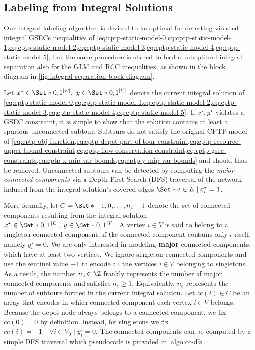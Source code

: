 \subsection{Labeling from Integral Solutions}
\label{sec:impl-labeling-integral-solutions}

Our integral labeling algorithm
is devised to be optimal for detecting violated integral GSECs inequalities
of \cref{eq:cptp-static-model-0,eq:cptp-static-model-1,eq:cptp-static-model-2,eq:cptp-static-model-3,eq:cptp-static-model-4,eq:cptp-static-model-5},
but the same procedure is shared
to feed a suboptimal integral separation also for the GLM and RCC inequalities,
as shown in the block diagram in \cref{fig:integral-separation-block-diagram}.

Let $x^\star \in \Set*{0, 1}^{|E|},\ y \in \Set*{0, 1}^{|V|}$ denote the
current integral solution of
\cref{eq:cptp-static-model-0,eq:cptp-static-model-1,eq:cptp-static-model-2,eq:cptp-static-model-3,eq:cptp-static-model-4,eq:cptp-static-model-5}.
If $x^\star, y^\star$ violates a GSEC constraint,
it is simple to show that the solution contains at least a spurious unconnected subtour.
Subtours do not satisfy the original CPTP model of
\cref{eq:cptp-obj-function,eq:cptp-depot-part-of-tour-constraint,eq:cptp-resource-upper-bound-constraint,eq:cptp-flow-conservation-constraint,eq:cptp-gsec-constraints,eq:cptp-x-mip-var-bounds,eq:cptp-y-mip-var-bounds}
and should thus be removed.
Unconnected subtours can be detected
by computing the \textit{major connected components}
via a Depth-First Search (DFS) traversal
of the network induced from the integral solution's covered edges $\Set*{e \in E \mid x^\star_e = 1}$.

\medskip

More formally,
let $C = \Set*{-1, 0, \dots, n_c - 1}$ denote the set of connected components
resulting from the integral solution $x^\star \in \Set*{0, 1}^{|E|},\ y \in \Set*{0, 1}^{|V|}$.
A vertex $i \in V$ is said to belong to a singleton connected component,
if the connected component contains only $i$ itself, namely $y^\star_i = 0$.
We are only interested in modeling \textbf{major} connected components,
which have at least two vertices.
We ignore singleton connected components
and use the sentinel value $-1$ to encode all the vertices $i \in V$ belonging to singletons.
As a result, the number $n_c \in \Z$ frankly represents the number
of major connected components and satisfies $n_c \ge 1$.
Equivalently,
$n_c$ represents the number of subtours formed in the current integral solution.
Let $cc(i) \in C$ be an array
that encodes in which connected component each vertex $i \in V$ belongs.
Because the depot node always belongs to a connected component,
we fix $cc(0) = 0$ by definition.
Instead, for singletons we fix $cc(i) = -1  \quad \forall i \in V_0 \mid y^\star_i = 0$.
The connected components can be computed
by a simple DFS traversal which pseudocode is provided in \cref{algo:cc-dfs}.

